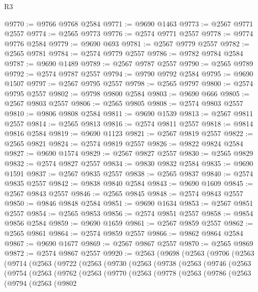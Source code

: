 \begin{lexlean}{R3}
\begin{coremodule}
@9770 := @9766 @9768 @2584
@9771 := @9690 @1463
@9773 := @2567 @9771 @2557
@9774 := @2565 @9773
@9776 := @2574 @9771 @2557
@9778 := @9774 @9776 @2584
@9779 := @9690 @693
@9781 := @2567 @9779 @2557
@9782 := @2565 @9781
@9784 := @2574 @9779 @2557
@9786 := @9782 @9784 @2584
@9787 := @9690 @1489
@9789 := @2567 @9787 @2557
@9790 := @2565 @9789
@9792 := @2574 @9787 @2557
@9794 := @9790 @9792 @2584
@9795 := @9690 @1507
@9797 := @2567 @9795 @2557
@9798 := @2565 @9797
@9800 := @2574 @9795 @2557
@9802 := @9798 @9800 @2584
@9803 := @9690 @666
@9805 := @2567 @9803 @2557
@9806 := @2565 @9805
@9808 := @2574 @9803 @2557
@9810 := @9806 @9808 @2584
@9811 := @9690 @1539
@9813 := @2567 @9811 @2557
@9814 := @2565 @9813
@9816 := @2574 @9811 @2557
@9818 := @9814 @9816 @2584
@9819 := @9690 @1123
@9821 := @2567 @9819 @2557
@9822 := @2565 @9821
@9824 := @2574 @9819 @2557
@9826 := @9822 @9824 @2584
@9827 := @9690 @1574
@9829 := @2567 @9827 @2557
@9830 := @2565 @9829
@9832 := @2574 @9827 @2557
@9834 := @9830 @9832 @2584
@9835 := @9690 @1591
@9837 := @2567 @9835 @2557
@9838 := @2565 @9837
@9840 := @2574 @9835 @2557
@9842 := @9838 @9840 @2584
@9843 := @9690 @1609
@9845 := @2567 @9843 @2557
@9846 := @2565 @9845
@9848 := @2574 @9843 @2557
@9850 := @9846 @9848 @2584
@9851 := @9690 @1634
@9853 := @2567 @9851 @2557
@9854 := @2565 @9853
@9856 := @2574 @9851 @2557
@9858 := @9854 @9856 @2584
@9859 := @9690 @1659
@9861 := @2567 @9859 @2557
@9862 := @2565 @9861
@9864 := @2574 @9859 @2557
@9866 := @9862 @9864 @2584
@9867 := @9690 @1677
@9869 := @2567 @9867 @2557
@9870 := @2565 @9869
@9872 := @2574 @9867 @2557
@9920 := @2563
    (@9698
      (@2563
        (@9706
          (@2563
            (@9714
              (@2563
                (@9722
                  (@2563
                    (@9730
                      (@2563
                        (@9738
                          (@2563
                            (@9746
                              (@2563
                                (@9754
                                  (@2563
                                    (@9762
                                      (@2563
                                        (@9770
                                          (@2563
                                            (@9778
                                              (@2563
                                                (@9786
                                                  (@2563
                                                    (@9794
                                                      (@2563
                                                        (@9802

\end{coremodule}
\end{lexlean}
